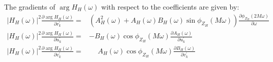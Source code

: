 \documentclass[a4paper,twoside,10pt,english]{report}
\begin{document}
The gradients of $\arg H_{H}\left(\omega\right)$ with respect to the coefficients
are given by:
\begin{align*}
  \left|H_{H}\left(\omega\right)\right|^{2}
  \frac{\partial\arg H_{H}\left(\omega\right)}{\partial r^{\prime}_{k}}
  =& \left(A_{H}^{2}\left(\omega\right)+
     A_{H}\left(\omega\right)B_{H}\left(\omega\right)
     \sin\phi_{Z_{H}}\left(M\omega\right)\right)
     \frac{\partial\phi_{Z_{H}}\left(2M\omega\right)}{\partial\omega} \\
  \left|H_{H}\left(\omega\right)\right|^{2} 
  \frac{\partial\arg H_{H}\left(\omega\right)}{\partial u^{\prime}_{k}}
  =&-B_{H}\left(\omega\right)\cos\phi_{Z_{H}}\left(M\omega\right)
     \frac{\partial A_{H}\left(\omega\right)}{\partial u^{\prime}_{k}} \\
  \left|H_{H}\left(\omega\right)\right|^{2} 
  \frac{\partial\arg H_{H}\left(\omega\right)}{\partial v^{\prime}_{k}}
  =& \phantom{-}A_{H}\left(\omega\right)\cos\phi_{Z_{H}}\left(M\omega\right)
     \frac{\partial B_{H}\left(\omega\right)}{\partial v^{\prime}_{k}}
\end{align*}
\end{document}

